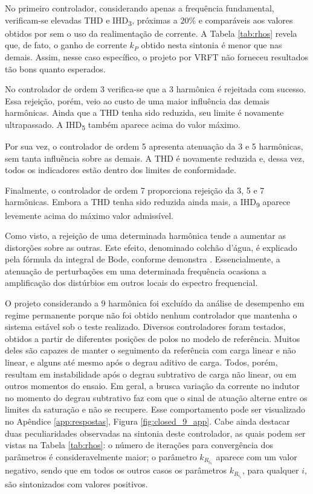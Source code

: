 \documentclass[repeatfields,oneside]{tcc}
\begin{document}
No primeiro controlador, considerando apenas a frequência fundamental, verificam-se elevadas THD e IHD\textsubscript{3}, próximas a $20\%$ e comparáveis aos valores obtidos por \textcite{Corleta2016} sem o uso da realimentação de corrente.
A Tabela \ref{tab:rhos} revela que, de fato, o ganho de corrente $k_P$ obtido nesta sintonia é menor que nas demais.
Assim, nesse caso específico, o projeto por VRFT não forneceu resultados tão bons quanto esperados.

No controlador de ordem 3 verifica-se que a 3{\textordfeminine} harmônica é rejeitada com sucesso.
Essa rejeição, porém, veio ao custo de uma maior influência das demais harmônicas.
Ainda que a THD tenha sido reduzida, seu limite é novamente ultrapassado.
A IHD\textsubscript{5} também aparece acima do valor máximo.

Por sua vez, o controlador de ordem 5 apresenta atenuação da 3{\textordfeminine} e 5{\textordfeminine} harmônicas, sem tanta influência sobre as demais.
A THD é novamente reduzida e, dessa vez, todos os indicadores estão dentro dos limites de conformidade.

Finalmente, o controlador de ordem 7 proporciona rejeição da 3{\textordfeminine}, 5{\textordfeminine} e 7{\textordfeminine} harmônicas.
Embora a THD tenha sido reduzida ainda mais, a IHD\textsubscript{9} aparece levemente acima do máximo valor admissível.

Como visto, a rejeição de uma determinada harmônica tende a aumentar as distorções sobre as outras.
Este efeito, denominado colchão d'água, é explicado pela fórmula da integral de Bode, conforme demonstra \textcite{Bertoldi2019}.
Essencialmente, a atenuação de perturbações em uma determinada frequência ocasiona a amplificação dos distúrbios em outros locais do espectro frequencial.

O projeto considerando a 9{\textordfeminine} harmônica foi excluído da análise de desempenho em regime permanente porque não foi obtido nenhum controlador que mantenha o sistema estável sob o teste realizado.
Diversos controladores foram testados, obtidos a partir de diferentes posições de polos no modelo de referência.
Muitos deles são capazes de manter o seguimento da referência com carga linear e não linear, e alguns até mesmo após o degrau aditivo de carga.
Todos, porém, resultam em instabilidade após o degrau subtrativo de carga não linear, ou em outros momentos do ensaio.
Em geral, a brusca variação da corrente no indutor no momento do degrau subtrativo faz com que o sinal de atuação alterne entre os limites da saturação e não se recupere.
Esse comportamento pode ser visualizado no Apêndice \ref{app:respostas}, Figura \ref{fig:closed_9_app}.
Cabe ainda destacar duas peculiaridades observadas na sintonia deste controlador, as quais podem ser vistas na Tabela \ref{tab:rhos}:
o número de iterações para convergência dos parâmetros é consideravelmente maior;
o parâmetro $k_{R_{5_1}}$ aparece com um valor negativo, sendo que em todos os outros casos os parâmetros $k_{R_{i_1}}$, para qualquer $i$, são sintonizados com valores positivos.
\end{document}
